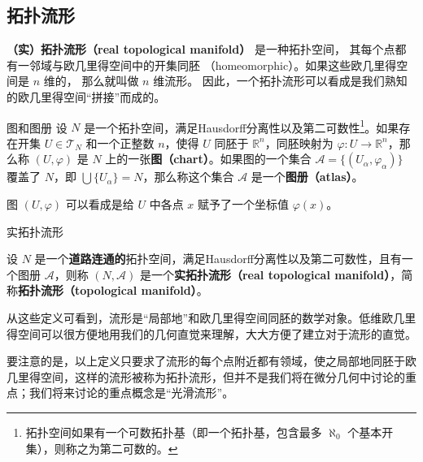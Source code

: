 

\subsection{拓扑流形}

\textbf{（实）拓扑流形（real topological manifold）} 是一种拓扑空间， 其每个点都有一邻域与欧几里得空间中的开集同胚 （homeomorphic）。如果这些欧几里得空间是 $n$ 维的， 那么就叫做 $n$ 维流形。 因此，一个拓扑流形可以看成是我们熟知的欧几里得空间“拼接”而成的。

\begin{definition}{图和图册}\label{def_Manif_1}
设 $N$ 是一个拓扑空间，满足Hausdorff分离性以及第二可数性\footnote{拓扑空间如果有一个可数拓扑基（即一个拓扑基，包含最多 $\aleph_0$ 个基本开集），则称之为第二可数的。}。如果存在开集 $U\in\mathcal{T}_N$ 和一个正整数 $n$，使得 $U$ 同胚于 $\mathbb{R}^n$，同胚映射为 $\varphi:U\rightarrow\mathbb{R}^n$，那么称 $(U,\varphi)$ 是 $N$ 上的一张\textbf{图（chart）}。如果图的一个集合 $\mathcal{A}=\{(U_\alpha, \varphi_\alpha)\}$ 覆盖了 $N$，即 $\bigcup\{U_\alpha\}=N$，那么称这个集合 $\mathcal{A}$ 是一个\textbf{图册（atlas）}。
\end{definition}

图 $(U, \varphi)$ 可以看成是给 $U$ 中各点 $x$ 赋予了一个坐标值 $\varphi(x)$。

\begin{definition}{实拓扑流形}\label{def_Manif_2}

设 $N$ 是一个\textbf{道路连通的}拓扑空间，满足Hausdorff分离性以及第二可数性，且有一个图册 $\mathcal{A}$，则称 $(N, \mathcal{A})$ 是一个\textbf{实拓扑流形（real topological manifold）}，简称\textbf{拓扑流形（topological manifold）}。

\end{definition}

从这些定义可看到，流形是“局部地”和欧几里得空间同胚的数学对象。低维欧几里得空间可以很方便地用我们的几何直觉来理解，大大方便了建立对于流形的直觉。

要注意的是，以上定义只要求了流形的每个点附近都有领域，使之局部地同胚于欧几里得空间，这样的流形被称为拓扑流形，但并不是我们将在微分几何中讨论的重点；我们将来讨论的重点概念是“光滑流形”。


